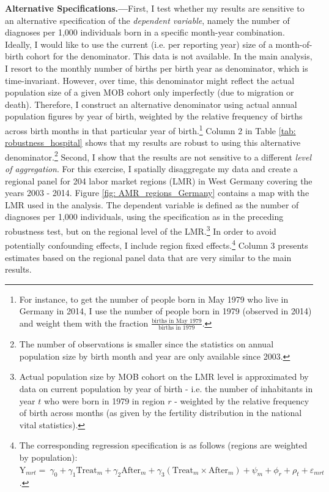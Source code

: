 \documentclass[11pt, a4paper, draft]{article} %
\begin{document}
\textbf{Alternative Specifications.---}First, I test whether my results are sensitive to an alternative specification of the \textit{dependent variable}, namely the number of diagnoses per 1,000 individuals born in a specific month-year combination. Ideally, I would like to use the current (i.e. per reporting year) size of a month-of-birth cohort for the denominator. This data is not available. In the main analysis, I resort to the monthly number of births per birth year as denominator, which is time-invariant. However, over time, this denominator might reflect the actual population size of a given MOB cohort only imperfectly (due to migration or death). Therefore, I construct an alternative denominator using actual annual population figures by year of birth, weighted by the relative frequency of births across birth months in that particular year of birth.\footnote{For instance, to get the number of people born in May 1979 who live in Germany in 2014, I use the number of people born in 1979 (observed in 2014) and weight them with the fraction $\frac{\text{births in May 1979}}{\text{births in 1979}}$.} Column 2 in Table \ref{tab: robustness_hospital} shows that my results are robust to using this alternative denominator.\footnote{The number of observations is smaller since the statistics on annual population size by birth month and year are only available since 2003.} Second, I show that the results are not sensitive to a different \textit{level of aggregation}. For this exercise, I spatially disaggregate my data and create a regional panel for 204 labor market regions (LMR) in West Germany covering the years 2003 - 2014. Figure \ref{fig: AMR_regions_Germany} contains a map with the LMR used in the analysis. The dependent variable is defined as the number of diagnoses per 1,000 individuals, using the specification as in the preceding robustness test, but on the regional level of the LMR.\footnote{Actual population size by MOB cohort on the LMR level is approximated by data on current population by year of birth - i.e. the number of inhabitants in year $t$ who were born in 1979 in region $r$ - weighted by the relative frequency of birth across months (as given by the fertility distribution in the national vital statistics).} In order to avoid potentially confounding effects, I include region fixed effects.\footnote{The corresponding regression specification is as follows (regions are weighted by population):\newline $\text{Y}_{mrt} =\ \gamma_0 + \gamma_1 \text{Treat}_{m} + \gamma_2 \text{After}_{m} + \gamma_3 (\text{Treat}_{m} \times \text{After}_{m}) + \psi_m + \phi_r + \rho_t + \varepsilon_{mrt} \label{eq:DD_LMR}$.} Column 3 presents estimates based on the regional panel data that are very similar to the main results. \newline
\end{document}

